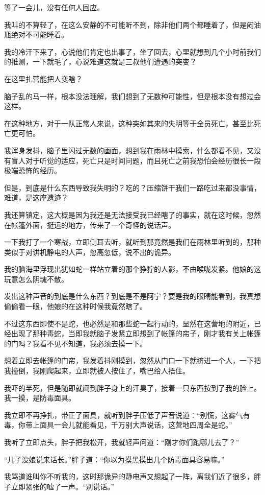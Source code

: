 等了一会儿，没有任何人回应。

我叫的不算轻了，在这么安静的不可能听不到，除非他们两个都睡着了，但是闷油瓶绝对不可能睡着。

我的冷汗下来了，心说他们肯定也出事了，坐了回去，心里就想到几个小时前我们的推测，一下就毛了，心说难道这就是三叔他们遭遇的突变？

在这里扎营能把人变瞎？

脑子乱的马一样，根本没法理解，我们想到了无数种可能性，但是根本没有想过会这样。

在这种地方，对于一队正常人来说，这种突如其来的失明等于全员死亡，甚至比死亡更可怕。

我浑身发抖，脑子里闪过无数的画面，想到我在雨林中摸索，什么都看不见，又没有盲人对于听觉的适应，死亡只是时间问题，而且死亡之前我恐怕会经历很长一段极端恐怖的经历。

但是，到底是什么东西导致我失明的？吃的？压缩饼干我们一路吃过来都没事情，难道，是这座遗迹？

我还算镇定，这大概是因为我还是无法接受我已经瞎了的事实，就在这时候，忽然在帐篷外面，挺远的地方，传来了一个奇怪的说话声。

一下我打了一个寒战，立即侧耳去听，就听到那竟然是我们在雨林里听到的，那种类似于对讲机静电的人声，忽高忽低，说不出的诡异。

我的脑海里浮现出犹如蛇一样站立着的那个狰狞的人影，不由喉咙发紧。他娘的这玩意怎么阴魂不散。

发出这种声音的到底是什么东西？到底是不是阿宁？要是我的眼睛能看到，我真想偷偷看一眼，他娘的在这种时候我竟然瞎了。

不过这东西即使不是蛇，也必然是和那些蛇一起行动的，显然在这营地的附近，已经出现了那种毒蛇，当即我就脑子发紧立即想到了帐篷的帘子，刚才我有关上帐篷的门吗？我看不见不知道，我必须去摸一下。

想着立即去帐篷的门帘，我发着抖刚摸到，忽然从门口一下就挤进一个人，一下把我撞倒，我刚爬起来，立即就被人按住了，嘴巴给人捂住。

我吓的半死，但是随即就闻到胖子身上的汗臭了，接着一只东西按到了我的脸上。我一摸，是防毒面具。

我立即不再挣扎，带正了面具，就听到胖子压低了声音说道：“别慌，这雾气有毒，你带上面具一会儿就能看见，千万别大声说话，这营地四周全是蛇。”

我听了立即点头，胖子把我松开，我就轻声问道：“刚才你们跑哪儿去了？”

“儿子没娘说来话长。”胖子道：“你以为摸黑摸出几个防毒面具容易嘛。”

我骂道谁叫你不听我的，这时那诡异的静电声又想起了一阵，离我们近了很多，胖子立即紧张的嘘了一声。“别说话。”

